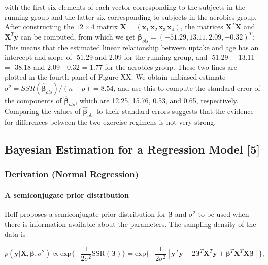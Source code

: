 \documentclass[12pt, a4paper]{article}
\begin{document}
\noindent with the first six elements of each vector corresponding to the subjects in the running group and the latter six corresponding to subjects in the aerobics group.  After constructing the $12 \times 4$ matrix $\mathbf{X} = (\mathbf{x}_1\, \mathbf{x}_2\, \mathbf{x}_3\, \mathbf{x}_4)$, the matrices $\mathbf{X}^T\mathbf{X}$ and $\mathbf{X}^T\mathbf{y}$ can be computed, from which we get $\boldsymbol\beta_{ols} = (-51.29,13.11,2.09,-0.32)^T$:\\

\noindent This means that the estimated linear relationship between uptake and age has an intercept and slope of -51.29 and 2.09 for the running group, and -51.29 + 13.11 = -38.18 and 2.09 - 0.32 = 1.77 for the aerobics group.  These two lines are plotted in the fourth panel of Figure XX.  We obtain unbiased estimate $\sigma^2 = SSR(\hat{\boldsymbol\beta}_{ols})/(n-p) = 8.54$, and use this to compute the standard error of the components of $\hat{\boldsymbol\beta}_{ols}$, which are 12.25, 15.76, 0.53, and 0.65, respectively.  Comparing the values of $\hat{\boldsymbol\beta}_{ols}$ to their standard errors suggests that the evidence for differences between the two exercise regimens is not very strong.





\clearpage

  \subsection{Bayesian Estimation for a Regression Model [5]}

  \subsubsection{Derivation (Normal Regression)}

    \paragraph{A semiconjugate prior distribution}\label{normRegSemiconjugatePrior}
    Hoff proposes a semiconjugate prior distribution for $\boldsymbol\beta$ and $\sigma^2$ to be used when there is information available about the parameters.  The sampling density of the data is

    $$p(\mathbf{y}|\mathbf{X},\boldsymbol\beta,\sigma^2) \propto \text{exp}\{-\frac{1}{2\sigma^2}\text{SSR}(\boldsymbol\beta)\} = \text{exp}\{-\frac{1}{2\sigma^2}[\mathbf{y}^T\mathbf{y} - 2\boldsymbol\beta^T\mathbf{X}^T\mathbf{y}+\boldsymbol\beta^T\mathbf{X}^T\mathbf{X}\boldsymbol\beta]\},$$
\end{document}
